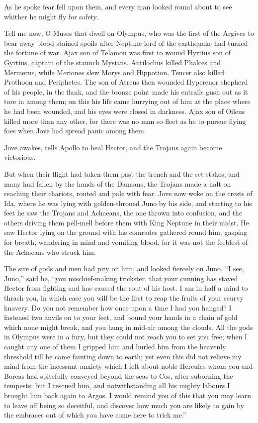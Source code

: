 As he spoke fear fell upon them, and every man looked round about to see
whither he might fly for safety.

Tell me now, O Muses that dwell on Olympus, who was the first of the
Argives to bear away blood-stained spoils after Neptune lord of the
earthquake had turned the fortune of war. Ajax son of Telamon was first to
wound Hyrtius son of Gyrtius, captain of the staunch Mysians. Antilochus
killed Phalces and Mermerus, while Meriones slew Morys and Hippotion,
Teucer also killed Prothoon and Periphetes. The son of Atreus then wounded
Hyperenor shepherd of his people, in the flank, and the bronze point made
his entrails gush out as it tore in among them; on this his life came
hurrying out of him at the place where he had been wounded, and his eyes
were closed in darkness. Ajax son of Oileus killed more than any other,
for there was no man so fleet as he to pursue flying foes when Jove had
spread panic among them.


Jove awakes, tells Apollo to heal Hector, and the Trojans again become
victorious.

But when their flight had taken them past the trench and the set stakes,
and many had fallen by the hands of the Danaans, the Trojans made a halt
on reaching their chariots, routed and pale with fear. Jove now woke on
the crests of Ida, where he was lying with golden-throned Juno by his
side, and starting to his feet he saw the Trojans and Achaeans, the one
thrown into confusion, and the others driving them pell-mell before them
with King Neptune in their midst. He saw Hector lying on the ground with
his comrades gathered round him, gasping for breath, wandering in mind and
vomiting blood, for it was not the feeblest of the Achaeans who struck
him.

The sire of gods and men had pity on him, and looked fiercely on Juno. “I
see, Juno,” said he, “you mischief-making trickster, that your cunning has
stayed Hector from fighting and has caused the rout of his host. I am in
half a mind to thrash you, in which case you will be the first to reap the
fruits of your scurvy knavery. Do you not remember how once upon a time I
had you hanged? I fastened two anvils on to your feet, and bound your
hands in a chain of gold which none might break, and you hung in mid-air
among the clouds. All the gods in Olympus were in a fury, but they could
not reach you to set you free; when I caught any one of them I gripped him
and hurled him from the heavenly threshold till he came fainting down to
earth; yet even this did not relieve my mind from the incessant anxiety
which I felt about noble Hercules whom you and Boreas had spitefully
conveyed beyond the seas to Cos, after suborning the tempests; but I
rescued him, and notwithstanding all his mighty labours I brought him back
again to Argos. I would remind you of this that you may learn to leave off
being so deceitful, and discover how much you are likely to gain by the
embraces out of which you have come here to trick me.”


